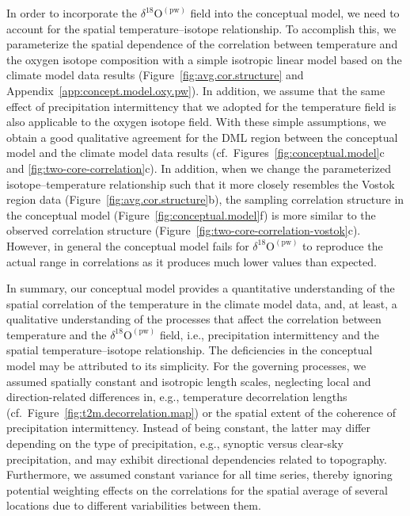 \documentclass[draft]{agujournal2019}
\begin{document}
In order to incorporate the $\delta^{18}\mathrm{O}^{\mathrm{(pw)}}$ field into
the conceptual model, we need to account for the spatial temperature--isotope
relationship. To accomplish this, we parameterize the spatial dependence of the
correlation between temperature and the oxygen isotope composition with a simple
isotropic linear model based on the climate model data results
(Figure~\ref{fig:avg.cor.structure} and
Appendix~\ref{app:concept.model.oxy.pw}). In addition, we assume that the same
effect of precipitation intermittency that we adopted for the temperature field
is also applicable to the oxygen isotope field. With these simple assumptions,
we obtain a good qualitative agreement for the DML region between the conceptual
model and the climate model data results (cf.\
Figures~\ref{fig:conceptual.model}c and \ref{fig:two-core-correlation}c). In
addition, when we change the parameterized isotope--temperature relationship
such that it more closely resembles the Vostok region data
(Figure~\ref{fig:avg.cor.structure}b), the sampling correlation structure in the
conceptual model (Figure~\ref{fig:conceptual.model}f) is more similar to the
observed correlation structure (Figure~\ref{fig:two-core-correlation-vostok}c).
However, in general the conceptual model fails for
$\delta^{18}\mathrm{O}^{\mathrm{(pw)}}$ to reproduce the actual range in
correlations as it produces much lower values than expected.

In summary, our conceptual model provides a quantitative understanding of the
spatial correlation of the temperature in the climate model data, and, at least,
a qualitative understanding of the processes that affect the correlation between
temperature and the $\delta^{18}\mathrm{O}^{\mathrm{(pw)}}$ field, i.e.,
precipitation intermittency and the spatial temperature--isotope
relationship. The deficiencies in the conceptual model may be attributed to its
simplicity. For the governing processes, we assumed spatially constant and
isotropic length scales, neglecting local and direction-related differences in,
e.g., temperature decorrelation lengths
(cf.~Figure~\ref{fig:t2m.decorrelation.map}) or the spatial extent of the
coherence of precipitation intermittency. Instead of being constant, the latter
may differ depending on the type of precipitation, e.g., synoptic versus
clear-sky precipitation, and may exhibit directional dependencies related to
topography. Furthermore, we assumed constant variance for all time series,
thereby ignoring potential weighting effects on the correlations for the spatial
average of several locations due to different variabilities between them.
\end{document}
